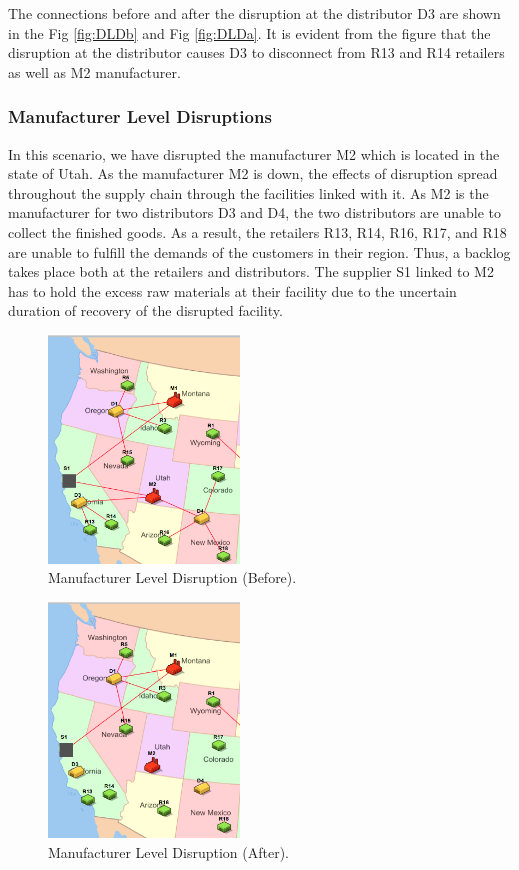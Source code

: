 The connections before and after the disruption at the distributor D3 are shown in the Fig \ref{fig:DLDb} and Fig \ref{fig:DLDa}. It is evident from the figure that the disruption at the distributor causes D3 to disconnect from R13 and R14 retailers as well as M2 manufacturer.

\subsubsection{Manufacturer Level Disruptions}

In this scenario, we have disrupted the manufacturer M2 which is located in the state of Utah. As the manufacturer M2 is down, the effects of disruption spread throughout the supply chain through the facilities linked with it. As M2 is the manufacturer for two distributors D3 and D4, the two distributors are unable to collect the finished goods. As a result, the retailers R13, R14, R16, R17, and R18 are unable to fulfill the demands of the customers in their region. Thus, a backlog takes place both at the retailers and distributors. The supplier S1 linked to M2 has to hold the excess raw materials at their facility due to the uncertain duration of recovery of the disrupted facility. 

 \begin{figure}[H]
   \centering
    \includegraphics[width=2.0in]{figures/pdf/BeforeM.png} 
    \caption{Manufacturer Level Disruption (Before).}
    \label{fig:MLDb}
\end{figure}

\begin{figure}[H]
    \centering
   \includegraphics[width=2.0in]{figures/pdf/AfterM.png}
   \caption{Manufacturer Level Disruption (After).}
   \label{fig:MLDa}
\end{figure}

